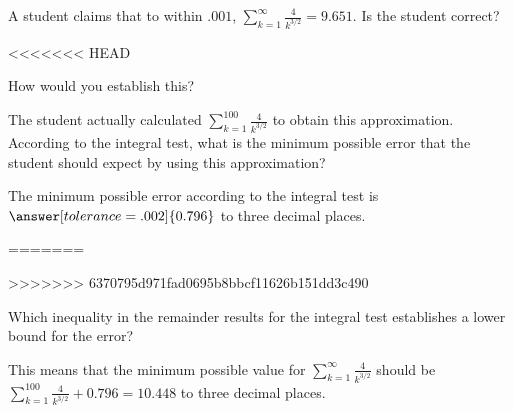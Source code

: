 \documentclass{ximera}
\author{Jim Talamo}
\begin{document}
\begin{exercise}

A student claims that to within $.001$, $\sum_{k=1}^{\infty} \frac{4}{k^{3/2}} = 9.651$.  Is the student correct?

<<<<<<< HEAD
\begin{multipleChoice}
\end{multipleChoice}

How would you establish this?

\begin{multipleChoice}
\end{multipleChoice}

\begin{feedback}
The student actually calculated $\sum_{k=1}^{100} \frac{4}{k^{3/2}}$ to obtain this approximation.  According to the integral test, what is the minimum possible error that the student should expect by using this approximation?

The minimum possible error according to the integral test is $\answer[tolerance=.002]{0.796}$ to three decimal places.  
\end{feedback}
=======
\begin{selectAll}
\end{selectAll}
>>>>>>> 6370795d971fad0695b8bbcf11626b151dd3c490

\begin{hint}
Which inequality in the remainder results for the integral test establishes a lower bound for the error?
\end{hint}

\begin{feedback}
This means that the minimum possible value for $\sum_{k=1}^{\infty} \frac{4}{k^{3/2}}$ should be $\sum_{k=1}^{100} \frac{4}{k^{3/2}} +0.796 = 10.448$ to three decimal places.
\end{feedback}


\end{exercise}
\end{document}
